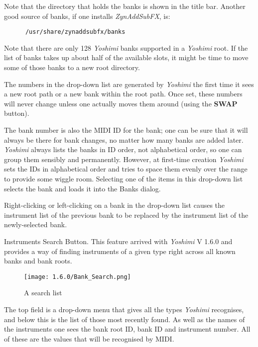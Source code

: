    Note that the directory that holds the banks is shown in the title bar.
   Another good source of banks, if one installs \textsl{ZynAddSubFX}, is:

   \begin{verbatim}
      /usr/share/zynaddsubfx/banks
   \end{verbatim}

   Note that there are only 128 \textsl{Yoshimi} banks
   supported in a \textsl{Yoshimi} root.
   If the list of banks takes up about half of the available slots, it might be
   time to move some of those banks to a new root directory.

   The numbers in the drop-down list are generated by \textsl{Yoshimi} the
   first time it sees a new root path or a new bank within the root path.
   Once set, these numbers will never change unless one actually moves them
   around (using the \textbf{SWAP} button).

   The bank number is also the MIDI ID for the bank;
   one can be sure that it will always
   be there for bank changes, no matter how many banks are added later.
   \textsl{Yoshimi} always lists the banks in ID order, not alphabetical
   order, so one can group them sensibly and permanently.
   However, at first-time creation \textsl{Yoshimi} sets the IDs in
   alphabetical order and tries to space them evenly over the range to
   provide some wiggle room.
   Selecting one of the items in this drop-down list selects the bank and
   loads it into the Banks dialog.

   Right-clicking or left-clicking on a bank in the drop-down list
   causes the instrument list of the previous bank to be replaced by the
   instrument list of the newly-selected bank.

   Instruments Search Button.
   This feature arrived with \textsl{Yoshimi} V 1.6.0 and provides a
   way of finding instruments of a given type right across all known banks and
   bank roots.


\begin{figure}[H]
   \centering
   \texttt{[image: 1.6.0/Bank\_Search.png]}
   \caption[A search list List]{A search list}
   \label{fig:bank_search}
\end{figure}
   The top field is a drop-down menu that gives all the types
   \textsl{Yoshimi} recognises, and below this is the list of those
   most recently found. As well as the names of the instruments
   one sees the bank root ID, bank ID and instrument number. All of these
   are the values that will be recognised by MIDI.

